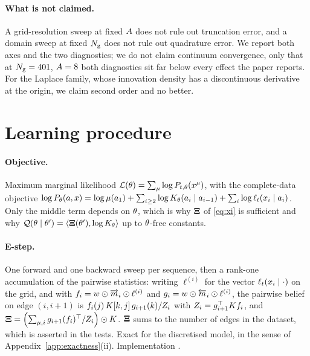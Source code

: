 \paragraph{What is not claimed.} A grid-resolution sweep at fixed $A$ does not rule out
truncation error, and a domain sweep at fixed $N_{\mathrm{g}}$ does not rule out quadrature error. We
report both axes and the two diagnostics; we do not claim continuum convergence, only that at
$N_{\mathrm{g}}=401$, $A=8$ both diagnostics sit far below every effect the paper reports.
For the Laplace family, whose innovation density has a discontinuous derivative at the origin, we
claim second order and no better.

\section{Learning procedure}
\label{app:learning}

\paragraph{Objective.} Maximum marginal likelihood
$\mathcal{L}(\theta) = \sum_\mu\log P_{t,\theta}(x^\mu)$, with the complete-data objective
$\log P_\theta(a,x) = \log\mu(a_1) + \sum_{i\ge2}\log K_{\theta}(a_i\mid a_{i-1}) +
\sum_i\log\ell_t(x_i\mid a_i)$. Only the middle term depends on $\theta$, which is why $\mathbf{\Xi}$ of
\eqref{eq:xi} is sufficient and why $\mathcal{Q}(\theta\mid\theta') = \langle\mathbf{\Xi}(\theta'),
\log K_{\theta}\rangle$ up to $\theta$-free constants.

\paragraph{E-step.} One forward and one backward sweep per sequence, then a rank-one accumulation
of the pairwise statistics: writing $\ell^{(i)}$ for the vector $\ell_t(x_i\mid \cdot)$ on the
grid, and with $f_i = w\odot\overrightarrow{m}_i\odot\ell^{(i)}$ and $g_i = w\odot\overleftarrow{m}_i\odot\ell^{(i)}$,
the pairwise belief on edge $(i,i+1)$ is
$f_i(j)\,K[k,j]\,g_{i+1}(k)/Z_i$ with $Z_i = g_{i+1}^\top K f_i$, and
$\mathbf{\Xi} = \left(\sum_{\mu,i} g_{i+1}(f_i)^\top/Z_i\right)\odot K$. $\mathbf{\Xi}$ sums to the number
of edges in the dataset, which is asserted in the tests. Exact for the discretised model, in the
sense of Appendix~\ref{app:exactness}(ii). Implementation .

